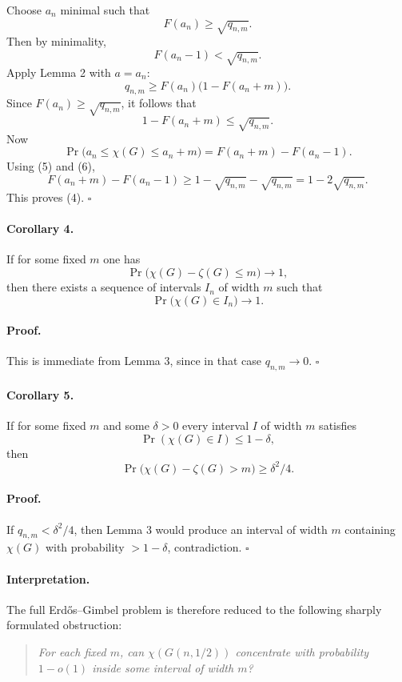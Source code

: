 Choose $a_n$ minimal such that
\[
F(a_n)\ge \sqrt{q_{n,m}}.
\]
Then by minimality,
\[
F(a_n-1)<\sqrt{q_{n,m}}.
\tag{5}
\]
Apply Lemma 2 with $a=a_n$:
\[
q_{n,m}\ge F(a_n)\bigl(1-F(a_n+m)\bigr).
\]
Since $F(a_n)\ge \sqrt{q_{n,m}}$, it follows that
\[
1-F(a_n+m)\le \sqrt{q_{n,m}}.
\tag{6}
\]
Now
\[
\Pr\bigl(a_n\le \chi(G)\le a_n+m\bigr)
=
F(a_n+m)-F(a_n-1).
\]
Using (5) and (6),
\[
F(a_n+m)-F(a_n-1)\ge 1-\sqrt{q_{n,m}}-\sqrt{q_{n,m}}
=1-2\sqrt{q_{n,m}}.
\]
This proves (4). \hfill $\square$

\paragraph{Corollary 4.}
If for some fixed $m$ one has
\[
\Pr\bigl(\chi(G)-\zeta(G)\le m\bigr)\to 1,
\]
then there exists a sequence of intervals $I_n$ of width $m$ such that
\[
\Pr\bigl(\chi(G)\in I_n\bigr)\to 1.
\]

\paragraph{Proof.}
This is immediate from Lemma 3, since in that case $q_{n,m}\to 0$. \hfill $\square$

\paragraph{Corollary 5.}
If for some fixed $m$ and some $\delta>0$ every interval $I$ of width $m$ satisfies
\[
\Pr(\chi(G)\in I)\le 1-\delta,
\]
then
\[
\Pr\bigl(\chi(G)-\zeta(G)>m\bigr)\ge \delta^2/4.
\]

\paragraph{Proof.}
If $q_{n,m}<\delta^2/4$, then Lemma 3 would produce an interval of width $m$
containing $\chi(G)$ with probability $>1-\delta$, contradiction. \hfill $\square$

\paragraph{Interpretation.}
The full Erd\H{o}s--Gimbel problem is therefore reduced to the following sharply formulated obstruction:

\begin{quote}
\emph{For each fixed $m$, can $\chi(G(n,1/2))$ concentrate with probability $1-o(1)$
inside some interval of width $m$?}
\end{quote}

